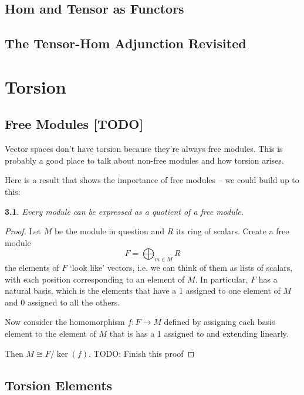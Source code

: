 \documentclass[oneside,english]{amsbook}
\numberwithin{section}{chapter}
\theoremstyle{plain}
\newtheorem{thm}{\protect\theoremname}
\theoremstyle{definition}
\providecommand{\theoremname}{Theorem}
\begin{document}
		\section{Hom and Tensor as Functors}

		\section{The Tensor-Hom Adjunction Revisited}


	\chapter{Torsion}
		
		\section{Free Modules [TODO]}
			
			Vector spaces don't have torsion because they're always free modules. This is probably a good place to talk about non-free modules and how torsion arises.
			
			Here is a result that shows the importance of free modules -- we could build up to this:
			
			\begin{thm}
				Every module can be expressed as a quotient of a free module.
			\end{thm}
			
			\begin{proof}
				Let $M$ be the module in question and $R$ its ring of scalars. Create a free module
				\[
					F = \bigoplus_{m\in M} R
				\]
				the elements of $F$ `look like' vectors, i.e. we can think of them as lists of scalars, with each position corresponding to an element of $M$. In particular, $F$ has a natural basis, which is the elements that have a 1 assigned to one element of $M$ and 0 assigned to all the others.
				
				Now consider the homomorphism $f:F\to M$ defined by assigning each basis element to the element of $M$ that is has a 1 assigned to and extending linearly.
				
				Then $M\cong F/\ker(f)$. TODO: Finish this proof  
			\end{proof}

		\section{Torsion Elements}
			
\end{document}
